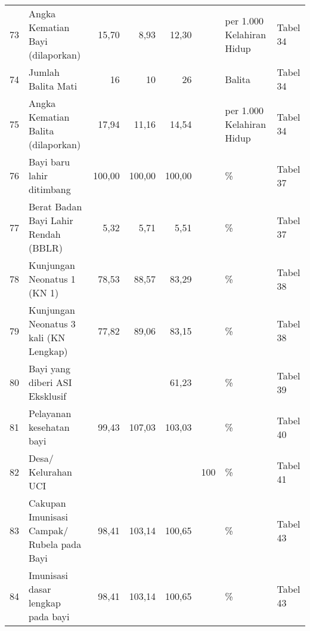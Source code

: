 \begin{small}
\begin{longtable}{rY{12em}rrrrY{5em}Y{5em}}
	 73 & Angka Kematian Bayi (dilaporkan)                                            &  15,70 &   8,93 &              12,30 &          & per 1.000 Kelahiran Hidup      & Tabel 34 \\
	 74 & Jumlah Balita Mati                                                          &     16 &     10 &                 26 &          & Balita                         & Tabel 34 \\
	 75 & Angka Kematian Balita (dilaporkan)                                          &  17,94 &  11,16 &              14,54 &          & per 1.000 Kelahiran Hidup      & Tabel 34 \\
	 76 & Bayi baru lahir ditimbang                                                   & 100,00 & 100,00 &             100,00 &          & \%                             & Tabel 37 \\
	 77 & Berat Badan Bayi Lahir Rendah (BBLR)                                        &   5,32 &   5,71 &               5,51 &          & \%                             & Tabel 37 \\
	 78 & Kunjungan Neonatus 1 (KN 1)                                                 &  78,53 &  88,57 &              83,29 &          & \%                             & Tabel 38 \\
	 79 & Kunjungan Neonatus 3 kali (KN Lengkap)                                      &  77,82 &  89,06 &              83,15 &          & \%                             & Tabel 38 \\
	 80 & Bayi yang diberi ASI Eksklusif                                              &        &        &              61,23 &          & \%                             & Tabel 39 \\
	 81 & Pelayanan kesehatan bayi                                                    &  99,43 & 107,03 &             103,03 &          & \%                             & Tabel 40 \\
	 82 & Desa/ Kelurahan UCI                                                         &        &        &                    &      100 & \%                             & Tabel 41 \\
	 83 & Cakupan Imunisasi Campak/ Rubela pada Bayi                                  &  98,41 & 103,14 &             100,65 &          & \%                             & Tabel 43 \\
	 84 & Imunisasi dasar lengkap pada bayi                                           &  98,41 & 103,14 &             100,65 &          & \%                             & Tabel 43 \\

\end{longtable}
\end{small}
